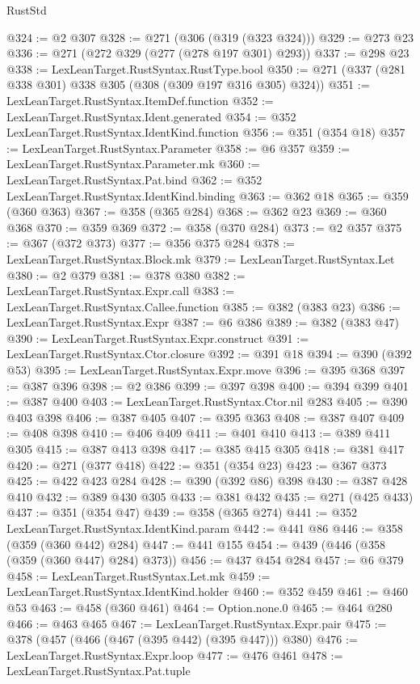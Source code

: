 \begin{lexlean}{RustStd}
\begin{coremodule}
@324 := @2 @307
@328 := @271 (@306 (@319 (@323 @324)))
@329 := @273 @23
@336 := @271 (@272 @329 (@277 (@278 @197 @301) @293))
@337 := @298 @23
@338 := LexLeanTarget.RustSyntax.RustType.bool
@350 := @271 (@337 (@281 @338 @301) @338 @305 (@308 (@309 @197 @316 @305) @324))
@351 := LexLeanTarget.RustSyntax.ItemDef.function
@352 := LexLeanTarget.RustSyntax.Ident.generated
@354 := @352 LexLeanTarget.RustSyntax.IdentKind.function
@356 := @351 (@354 @18)
@357 := LexLeanTarget.RustSyntax.Parameter
@358 := @6 @357
@359 := LexLeanTarget.RustSyntax.Parameter.mk
@360 := LexLeanTarget.RustSyntax.Pat.bind
@362 := @352 LexLeanTarget.RustSyntax.IdentKind.binding
@363 := @362 @18
@365 := @359 (@360 @363)
@367 := @358 (@365 @284)
@368 := @362 @23
@369 := @360 @368
@370 := @359 @369
@372 := @358 (@370 @284)
@373 := @2 @357
@375 := @367 (@372 @373)
@377 := @356 @375 @284
@378 := LexLeanTarget.RustSyntax.Block.mk
@379 := LexLeanTarget.RustSyntax.Let
@380 := @2 @379
@381 := @378 @380
@382 := LexLeanTarget.RustSyntax.Expr.call
@383 := LexLeanTarget.RustSyntax.Callee.function
@385 := @382 (@383 @23)
@386 := LexLeanTarget.RustSyntax.Expr
@387 := @6 @386
@389 := @382 (@383 @47)
@390 := LexLeanTarget.RustSyntax.Expr.construct
@391 := LexLeanTarget.RustSyntax.Ctor.closure
@392 := @391 @18
@394 := @390 (@392 @53)
@395 := LexLeanTarget.RustSyntax.Expr.move
@396 := @395 @368
@397 := @387 @396
@398 := @2 @386
@399 := @397 @398
@400 := @394 @399
@401 := @387 @400
@403 := LexLeanTarget.RustSyntax.Ctor.nil @283
@405 := @390 @403 @398
@406 := @387 @405
@407 := @395 @363
@408 := @387 @407
@409 := @408 @398
@410 := @406 @409
@411 := @401 @410
@413 := @389 @411 @305
@415 := @387 @413 @398
@417 := @385 @415 @305
@418 := @381 @417
@420 := @271 (@377 @418)
@422 := @351 (@354 @23)
@423 := @367 @373
@425 := @422 @423 @284
@428 := @390 (@392 @86) @398
@430 := @387 @428 @410
@432 := @389 @430 @305
@433 := @381 @432
@435 := @271 (@425 @433)
@437 := @351 (@354 @47)
@439 := @358 (@365 @274)
@441 := @352 LexLeanTarget.RustSyntax.IdentKind.param
@442 := @441 @86
@446 := @358 (@359 (@360 @442) @284)
@447 := @441 @155
@454 := @439 (@446 (@358 (@359 (@360 @447) @284) @373))
@456 := @437 @454 @284
@457 := @6 @379
@458 := LexLeanTarget.RustSyntax.Let.mk
@459 := LexLeanTarget.RustSyntax.IdentKind.holder
@460 := @352 @459
@461 := @460 @53
@463 := @458 (@360 @461)
@464 := Option.none.{0}
@465 := @464 @280
@466 := @463 @465
@467 := LexLeanTarget.RustSyntax.Expr.pair
@475 := @378 (@457 (@466 (@467 (@395 @442) (@395 @447))) @380)
@476 := LexLeanTarget.RustSyntax.Expr.loop
@477 := @476 @461
@478 := LexLeanTarget.RustSyntax.Pat.tuple

\end{coremodule}
\end{lexlean}
